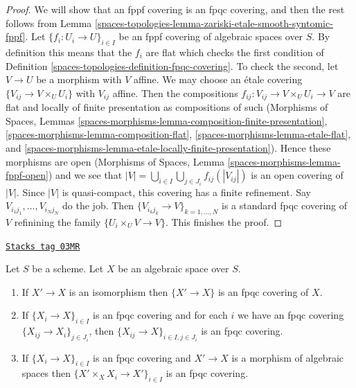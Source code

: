 \begin{proof}
We will show that an fppf covering is an fpqc covering, and then the
rest follows from
Lemma \ref{spaces-topologies-lemma-zariski-etale-smooth-syntomic-fppf}.
Let $\{f_i : U_i \to U\}_{i \in I}$ be an
fppf covering of algebraic spaces over $S$.
By definition this means that the $f_i$ are flat which checks the first
condition of Definition \ref{spaces-topologies-definition-fpqc-covering}. To check the
second, let $V \to U$ be a morphism with $V$ affine.
We may choose an \'etale covering $\{V_{ij} \to V \times_U U_i\}$
with $V_{ij}$ affine. Then the compositions
$f_{ij} : V_{ij} \to V \times_U U_i \to V$ are flat and locally of
finite presentation as compositions of such
(Morphisms of Spaces, Lemmas
\ref{spaces-morphisms-lemma-composition-finite-presentation},
\ref{spaces-morphisms-lemma-composition-flat},
\ref{spaces-morphisms-lemma-etale-flat}, and
\ref{spaces-morphisms-lemma-etale-locally-finite-presentation}).
Hence these morphisms are open
(Morphisms of Spaces, Lemma \ref{spaces-morphisms-lemma-fppf-open})
and we see that
$|V| = \bigcup_{i \in I} \bigcup_{j \in J_i} f_{ij}(|V_{ij}|)$
is an open covering of $|V|$.
Since $|V|$ is quasi-compact, this covering has a finite
refinement.
Say $V_{i_1j_1}, \ldots, V_{i_Nj_N}$ do the job.
Then $\{V_{i_kj_k} \to V\}_{k = 1, \ldots, N}$ is
a standard fpqc covering of $V$ refinining the family
$\{U_i \times_U V \to V\}$.
This finishes the proof.
\end{proof}

\begin{lemma}[Fpqc]
\label{spaces-topologies-lemma-fpqc}
\href{https://stacks.math.columbia.edu/tag/03MR}{\texttt{Stacks tag 03MR}}

Let $S$ be a scheme.
Let $X$ be an algebraic space over $S$.
\begin{enumerate}
\item If $X' \to X$ is an isomorphism then $\{X' \to X\}$
is an fpqc covering of $X$.
\item If $\{X_i \to X\}_{i\in I}$ is an fpqc covering and for each
$i$ we have an fpqc covering $\{X_{ij} \to X_i\}_{j\in J_i}$, then
$\{X_{ij} \to X\}_{i \in I, j\in J_i}$ is an fpqc covering.
\item If $\{X_i \to X\}_{i\in I}$ is an fpqc covering
and $X' \to X$ is a morphism of algebraic spaces then
$\{X' \times_X X_i \to X'\}_{i\in I}$ is an fpqc covering.
\end{enumerate}
\end{lemma}

